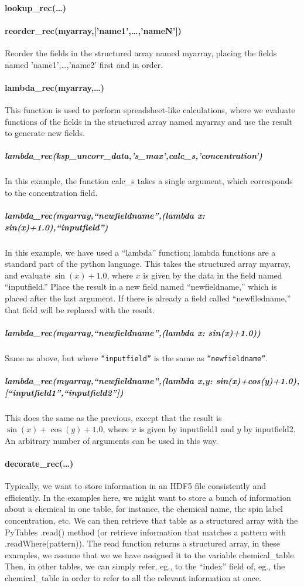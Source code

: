 \paragraph{lookup\_rec(\ldots)}
\paragraph{reorder\_rec(myarray,['name1',\ldots,'nameN'])}
Reorder the fields in the structured array named myarray,
    placing the fields named 'name1',\ldots,'name2'
    first and in order.
\paragraph{lambda\_rec(myarray,\ldots)}\label{codelabel:lambda_rec}
This function is used to perform spreadsheet-like calculations,
    where we evaluate functions of the fields in the structured
    array named myarray and use the result to generate new fields.

\subparagraph{lambda_rec(ksp_uncorr_data,'s_{max}',calc\_s,'concentration')}
In this example, the function calc\_s takes a single argument, which corresponds to the concentration field.
\subparagraph{lambda\_rec(myarray,``newfieldname'',(lambda x: sin(x)+1.0),``inputfield'')}
In this example, we have used a ``lambda'' function;
    lambda functions are a standard part of the python language.
This takes the structured array myarray,
    and evaluate $\sin(x)+1.0$, where $x$ is given
    by the data in the field named ``inputfield.''
Place the result in a new field named ``newfieldname,''
    which is placed after the last argument.
If there is already a field called ``newfiledname,''
    that field will be replaced with the result.

\subparagraph{lambda\_rec(myarray,``newfieldname'',(lambda x: sin(x)+1.0))}
Same as above, but where \texttt{``inputfield''} is the same as \texttt{``newfieldname''}.
\subparagraph{lambda\_rec(myarray,``newfieldname'',(lambda x,y: sin(x)+cos(y)+1.0),[``inputfield1'',``inputfield2''])}
This does the same as the previous, except that
    the result is $\sin(x)+\cos(y)+1.0$, where
    $x$ is given by inputfield1 and $y$ by inputfield2.
An arbitrary number of arguments can be used in this way.
\paragraph{decorate\_rec(\ldots)}
Typically, we want to store information in an HDF5 file consistently
    and efficiently.
In the examples here,
    we might want to store a bunch of information about a chemical
    in one table, for instance, the chemical name, the spin label
    concentration, etc.
We can then retrieve that table as a structured array
    with the PyTables .read() method
    (or retrieve information that matches a pattern with .readWhere(pattern)).
The read function returns a structured array,
    in these examples, we assume that we we have assigned it
    to the variable chemical\_table.
Then, in other tables,
    we can simply refer, eg., to the ``index'' field of, eg., the chemical\_table 
    in order to refer to all the relevant information at once.

